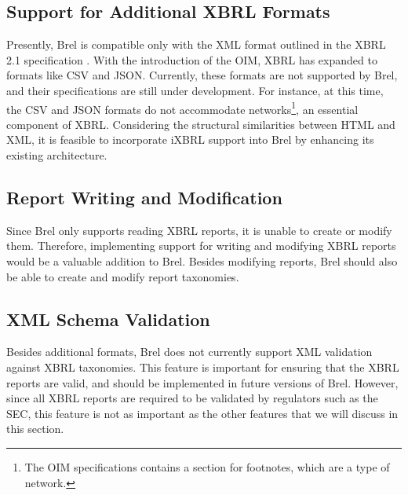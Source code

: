 \subsection{Support for Additional XBRL Formats}

Presently, Brel is compatible only with the XML format outlined in the XBRL 2.1 specification \cite{xbrl21}.
With the introduction of the OIM, XBRL has expanded to 
\textcolor{turkishrose}{formats like CSV and JSON}.
Currently, these formats are not supported by Brel, and their specifications are still under development.
For instance, at this time, the CSV and JSON formats do not accommodate networks\footnote{The OIM specifications contains a section for footnotes, which are a type of network.}, an essential component of XBRL.
Considering the structural similarities between HTML and XML, it is feasible to incorporate iXBRL support into Brel by enhancing its existing architecture.

\subsection{Report Writing and Modification}

Since Brel only supports reading XBRL reports, it is unable to create or modify them.
Therefore, implementing support for 
\textcolor{turkishrose}{writing and modifying XBRL reports} would be a valuable addition to Brel.
Besides modifying reports, Brel should also be able to create and modify report taxonomies.

\subsection{XML Schema Validation}

Besides additional formats, Brel does not currently support 
\textcolor{turkishrose}{XML validation against XBRL taxonomies}.
This feature is important for ensuring that the XBRL reports are valid, and should be implemented in future versions of Brel.
However, since all XBRL reports are required to be validated by regulators such as the SEC, this feature is not as important as the other features that we will discuss in this section.

